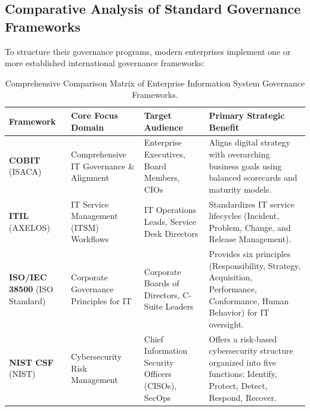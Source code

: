 \documentclass[11pt,a4paper]{article}
\begin{document}
\subsection{Comparative Analysis of Standard Governance Frameworks}
To structure their governance programs, modern enterprises implement one or more established international governance frameworks:

\begin{table}[htbp]
\centering
\small
\renewcommand{\arraystretch}{1.25}
\begin{tabularx}{\textwidth}{L{2.4cm} L{3.0cm} L{3.0cm} Y}
\toprule
{}
\textbf{Framework} & \textbf{Core Focus Domain} & \textbf{Target Audience} & \textbf{Primary Strategic Benefit} \\
\midrule
\textbf{COBIT} \newline (ISACA) & Comprehensive IT Governance \& Alignment & Enterprise Executives, Board Members, CIOs & Aligns digital strategy with overarching business goals using balanced scorecards and maturity models. \\
\textbf{ITIL} \newline (AXELOS) & IT Service Management (ITSM) Workflows & IT Operations Leads, Service Desk Directors & Standardizes IT service lifecycles (Incident, Problem, Change, and Release Management). \\
\textbf{ISO/IEC 38500} \newline (ISO Standard) & Corporate Governance Principles for IT & Corporate Boards of Directors, C-Suite Leaders & Provides six principles (Responsibility, Strategy, Acquisition, Performance, Conformance, Human Behavior) for IT oversight. \\
\textbf{NIST CSF} \newline (NIST) & Cybersecurity Risk Management & Chief Information Security Officers (CISOs), SecOps & Offers a risk-based cybersecurity structure organized into five functions: Identify, Protect, Detect, Respond, Recover. \\
\bottomrule
\end{tabularx}
\caption{Comprehensive Comparison Matrix of Enterprise Information System Governance Frameworks.}
\label{tab:governance_matrix}
\end{table}
\end{document}
